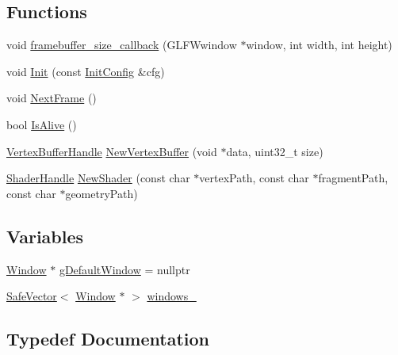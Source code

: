 \subsection*{Functions}
\begin{DoxyCompactItemize}
\item 
void \mbox{\hyperlink{namespacenabla_1_1renderer_a03960a6e4a33e91698d490ec9f827671}{framebuffer\+\_\+size\+\_\+callback}} (G\+L\+F\+Wwindow $\ast$window, int width, int height)
\item 
void \mbox{\hyperlink{namespacenabla_1_1renderer_a1d6afb5e4e6c8a114a419ccb7a435fd9}{Init}} (const \mbox{\hyperlink{structnabla_1_1renderer_1_1_init_config}{Init\+Config}} \&cfg)
\item 
void \mbox{\hyperlink{namespacenabla_1_1renderer_a0fcff1a6f88cc2c4cb542e08602f61d2}{Next\+Frame}} ()
\item 
bool \mbox{\hyperlink{namespacenabla_1_1renderer_a132f7a0ec4097927125ceb4515026b51}{Is\+Alive}} ()
\item 
\mbox{\hyperlink{namespacenabla_1_1renderer_aa901f31283abb372f2a5ca3b90e09f54}{Vertex\+Buffer\+Handle}} \mbox{\hyperlink{namespacenabla_1_1renderer_a57850d0b3aa2dcd479e84c32e1c3572f}{New\+Vertex\+Buffer}} (void $\ast$data, uint32\+\_\+t size)
\item 
\mbox{\hyperlink{namespacenabla_1_1renderer_a351c881c3df21186064938743d67dd85}{Shader\+Handle}} \mbox{\hyperlink{namespacenabla_1_1renderer_a5ff347f33b9171fe24bdc008fb13f395}{New\+Shader}} (const char $\ast$vertex\+Path, const char $\ast$fragment\+Path, const char $\ast$geometry\+Path)
\end{DoxyCompactItemize}
\subsection*{Variables}
\begin{DoxyCompactItemize}
\item 
\mbox{\hyperlink{classnabla_1_1renderer_1_1_window}{Window}} $\ast$ \mbox{\hyperlink{namespacenabla_1_1renderer_ab2fd6f46c4703e0daa3e3fe5a5cef74f}{g\+Default\+Window}} = nullptr
\item 
\mbox{\hyperlink{namespacenabla_a2f96ae838f528e078f7bcdb42fbbe706}{Safe\+Vector}}$<$ \mbox{\hyperlink{classnabla_1_1renderer_1_1_window}{Window}} $\ast$ $>$ \mbox{\hyperlink{namespacenabla_1_1renderer_ab71ae808482935d60cfc5551412768a0}{windows\+\_\+}}
\end{DoxyCompactItemize}


\subsection{Typedef Documentation}
\mbox{\label{namespacenabla_1_1renderer_a6c2d393ca75aa2575fca09b5ef8bda55}} 
